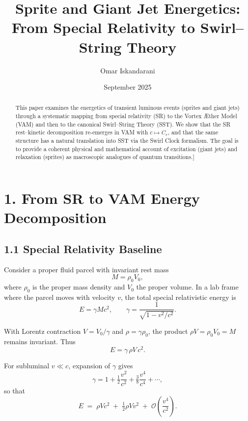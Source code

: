 \documentclass[11pt]{article}
\title{Sprite and Giant Jet Energetics: From Special Relativity to Swirl--String Theory}
\author{Omar Iskandarani}
\date{September 2025}
\newcommand{\Ce}{C_{e}}
\begin{document}
\maketitle

\begin{abstract}
This paper examines the energetics of transient luminous events (sprites and giant jets) through a systematic mapping from special relativity (SR) to the Vortex \AE ther Model (VAM) and then to the canonical Swirl--String Theory (SST). We show that the SR rest--kinetic decomposition re-emerges in VAM with $c \mapsto \Ce$, and that the same structure has a natural translation into SST via the Swirl Clock formalism. The goal is to provide a coherent physical and mathematical account of excitation (giant jets) and relaxation (sprites) as macroscopic analogues of quantum transitions.]
\end{abstract}

\section*{1. From SR to VAM Energy Decomposition}

    \subsection*{1.1 Special Relativity Baseline}

        Consider a proper fluid parcel with invariant rest mass
        \[
            M = \rho_0 V_0 ,
        \]
        where $\rho_0$ is the proper mass density and $V_0$ the proper volume.
        In a lab frame where the parcel moves with velocity $v$, the total
        special relativistic energy is
        \begin{equation}
        E = \gamma M c^2,
        \qquad
        \gamma = \frac{1}{\sqrt{1 - v^2/c^2}}.
        \label{eq:SRtotal}
        \end{equation}

        With Lorentz contraction $V = V_0/\gamma$ and $\rho = \gamma \rho_0$,
        the product $\rho V = \rho_0 V_0 = M$ remains invariant. Thus
        \begin{equation}
        E = \gamma\, \rho V\, c^2.
        \label{eq:SRrho}
        \end{equation}

        For subluminal $v \ll c$, expansion of $\gamma$ gives
        \[
            \gamma = 1 + \tfrac{1}{2}\frac{v^2}{c^2}
            + \tfrac{3}{8}\frac{v^4}{c^4} + \cdots,
        \]
        so that
        \begin{equation}
        E \;=\; \rho V c^2
        \;+\; \tfrac{1}{2}\rho V v^2
        \;+\; \mathcal{O}\!\left(\frac{v^4}{c^2}\right).
        \label{eq:SRsplit}
        \end{equation}
\end{document}
